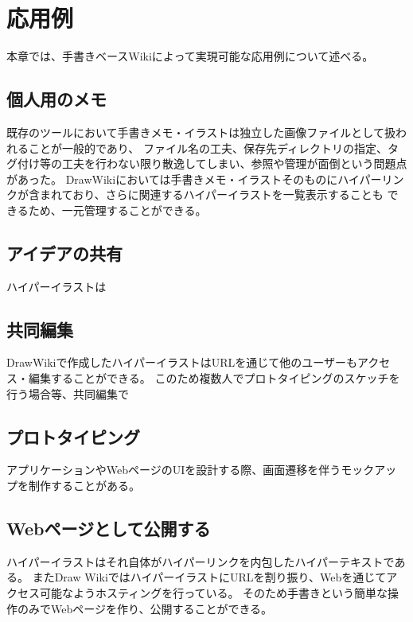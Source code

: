\chapter{応用例}
\label{chap:ouyou}

本章では、手書きベースWikiによって実現可能な応用例について述べる。

\newpage

\section{個人用のメモ}
既存のツールにおいて手書きメモ・イラストは独立した画像ファイルとして扱われることが一般的であり、
ファイル名の工夫、保存先ディレクトリの指定、タグ付け等の工夫を行わない限り散逸してしまい、参照や管理が面倒という問題点があった。
DrawWikiにおいては手書きメモ・イラストそのものにハイパーリンクが含まれており、さらに関連するハイパーイラストを一覧表示することも
できるため、一元管理することができる。

\section{アイデアの共有}
ハイパーイラストは

\section{共同編集}
DrawWikiで作成したハイパーイラストはURLを通じて他のユーザーもアクセス・編集することができる。
このため複数人でプロトタイピングのスケッチを行う場合等、共同編集で

\section{プロトタイピング}
アプリケーションやWebページのUIを設計する際、画面遷移を伴うモックアップを制作することがある。

\section{Webページとして公開する}
ハイパーイラストはそれ自体がハイパーリンクを内包したハイパーテキストである。
またDraw WikiではハイパーイラストにURLを割り振り、Webを通じてアクセス可能なようホスティングを行っている。
そのため手書きという簡単な操作のみでWebページを作り、公開することができる。



